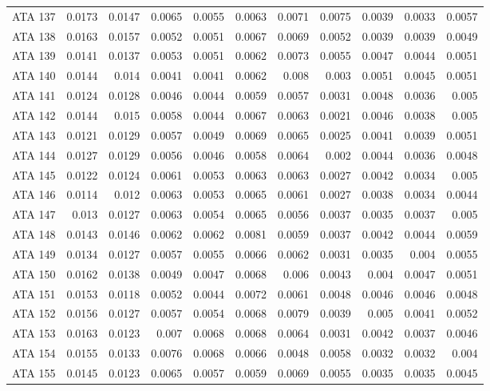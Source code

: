 \begin{landscape}
\begin{longtable}{rrrrrrrrrrr}
  ATA 137 & 0.0173 & 0.0147 & 0.0065 & 0.0055 & 0.0063 & 0.0071 & 0.0075 & 0.0039 & 0.0033 & 0.0057 \\ 
  ATA 138 & 0.0163 & 0.0157 & 0.0052 & 0.0051 & 0.0067 & 0.0069 & 0.0052 & 0.0039 & 0.0039 & 0.0049 \\ 
  ATA 139 & 0.0141 & 0.0137 & 0.0053 & 0.0051 & 0.0062 & 0.0073 & 0.0055 & 0.0047 & 0.0044 & 0.0051 \\ 
  ATA 140 & 0.0144 & 0.014 & 0.0041 & 0.0041 & 0.0062 & 0.008 & 0.003 & 0.0051 & 0.0045 & 0.0051 \\ 
  ATA 141 & 0.0124 & 0.0128 & 0.0046 & 0.0044 & 0.0059 & 0.0057 & 0.0031 & 0.0048 & 0.0036 & 0.005 \\ 
  ATA 142 & 0.0144 & 0.015 & 0.0058 & 0.0044 & 0.0067 & 0.0063 & 0.0021 & 0.0046 & 0.0038 & 0.005 \\ 
  ATA 143 & 0.0121 & 0.0129 & 0.0057 & 0.0049 & 0.0069 & 0.0065 & 0.0025 & 0.0041 & 0.0039 & 0.0051 \\ 
  ATA 144 & 0.0127 & 0.0129 & 0.0056 & 0.0046 & 0.0058 & 0.0064 & 0.002 & 0.0044 & 0.0036 & 0.0048 \\ 
  ATA 145 & 0.0122 & 0.0124 & 0.0061 & 0.0053 & 0.0063 & 0.0063 & 0.0027 & 0.0042 & 0.0034 & 0.005 \\ 
  ATA 146 & 0.0114 & 0.012 & 0.0063 & 0.0053 & 0.0065 & 0.0061 & 0.0027 & 0.0038 & 0.0034 & 0.0044 \\ 
  ATA 147 & 0.013 & 0.0127 & 0.0063 & 0.0054 & 0.0065 & 0.0056 & 0.0037 & 0.0035 & 0.0037 & 0.005 \\ 
  ATA 148 & 0.0143 & 0.0146 & 0.0062 & 0.0062 & 0.0081 & 0.0059 & 0.0037 & 0.0042 & 0.0044 & 0.0059 \\ 
  ATA 149 & 0.0134 & 0.0127 & 0.0057 & 0.0055 & 0.0066 & 0.0062 & 0.0031 & 0.0035 & 0.004 & 0.0055 \\ 
  ATA 150 & 0.0162 & 0.0138 & 0.0049 & 0.0047 & 0.0068 & 0.006 & 0.0043 & 0.004 & 0.0047 & 0.0051 \\ 
  ATA 151 & 0.0153 & 0.0118 & 0.0052 & 0.0044 & 0.0072 & 0.0061 & 0.0048 & 0.0046 & 0.0046 & 0.0048 \\ 
  ATA 152 & 0.0156 & 0.0127 & 0.0057 & 0.0054 & 0.0068 & 0.0079 & 0.0039 & 0.005 & 0.0041 & 0.0052 \\ 
  ATA 153 & 0.0163 & 0.0123 & 0.007 & 0.0068 & 0.0068 & 0.0064 & 0.0031 & 0.0042 & 0.0037 & 0.0046 \\ 
  ATA 154 & 0.0155 & 0.0133 & 0.0076 & 0.0068 & 0.0066 & 0.0048 & 0.0058 & 0.0032 & 0.0032 & 0.004 \\ 
  ATA 155 & 0.0145 & 0.0123 & 0.0065 & 0.0057 & 0.0059 & 0.0069 & 0.0055 & 0.0035 & 0.0035 & 0.0045 \\ 

\end{longtable}
\end{landscape}
